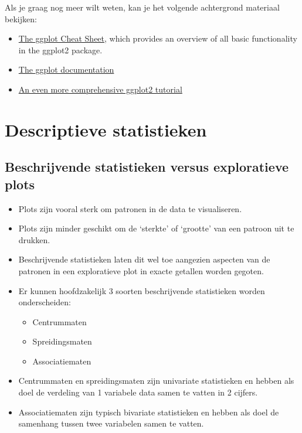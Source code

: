 \documentclass[]{tufte-book}
\providecommand{\tightlist}{%
  \setlength{\itemsep}{0pt}\setlength{\parskip}{0pt}}
\begin{document}
Als je graag nog meer wilt weten, kan je het volgende achtergrond materiaal bekijken:

\begin{itemize}
\tightlist
\item
  \href{https://www.rstudio.com/wp-content/uploads/2015/03/ggplot2-cheatsheet.pdf}{The ggplot Cheat Sheet}, which provides an overview of all basic functionality in the ggplot2 package.
\item
  \href{http://docs.ggplot2.org/current/}{The ggplot documentation}
\item
  \href{http://tutorials.iq.harvard.edu/R/Rgraphics/Rgraphics.html}{An even more comprehensive ggplot2 tutorial}
\end{itemize}

\hypertarget{descriptieve-statistieken}{%
\chapter{Descriptieve statistieken}\label{descriptieve-statistieken}}

\hypertarget{beschrijvende-statistieken-versus-exploratieve-plots}{%
\section{Beschrijvende statistieken versus exploratieve plots}\label{beschrijvende-statistieken-versus-exploratieve-plots}}

\begin{itemize}
\tightlist
\item
  Plots zijn vooral sterk om patronen in de data te visualiseren.
\item
  Plots zijn minder geschikt om de `sterkte' of `grootte' van een patroon uit te drukken.
\item
  Beschrijvende statistieken laten dit wel toe aangezien aspecten van de patronen in een exploratieve plot in exacte getallen worden gegoten.
\item
  Er kunnen hoofdzakelijk 3 soorten beschrijvende statistieken worden onderscheiden:

  \begin{itemize}
  \tightlist
  \item
    Centrummaten
  \item
    Spreidingsmaten
  \item
    Associatiematen
  \end{itemize}
\item
  Centrummaten en spreidingsmaten zijn univariate statistieken en hebben als doel de verdeling van 1 variabele data samen te vatten in 2 cijfers.
\item
  Associatiematen zijn typisch bivariate statistieken en hebben als doel de samenhang tussen twee variabelen samen te vatten.
\end{itemize}
\end{document}
